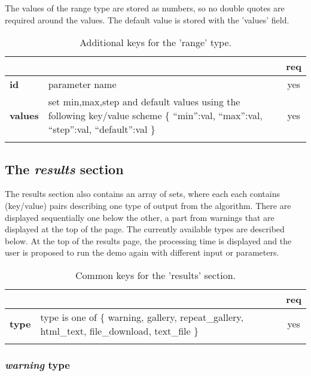 The values of the range type are stored as numbers, so no double quotes are 
required around the values. The default value is stored with the 'values' field.

\begin{longtable}{|>{\bf}L{\linewidth}|L{\linewidth}|c|}
\hline
      &  & {\bf req} 
\tabularnewline \hline \hline
 id     & parameter name  & yes \\ \hline
 values & set min,max,step and default values using the following key/value 
scheme \{ ``min'':val, ``max'':val, ``step'':val, ``default'':val \} & yes
                      \\ \hline
\caption{Additional keys for the 'range' type.}
\end{longtable}

\subsection{The \emph{results} section}


The results section also contains an array of sets, where each each contains 
(key/value) pairs describing one type of output from the algorithm. There are 
displayed sequentially one below the other, a part from warnings that are 
displayed at the top of the page. The currently available types are described 
below. At the top of the results page, the processing time is displayed and the 
user is proposed to run the demo again with different input or parameters.

\begin{longtable}{|>{\bf}L{\linewidth}|L{\linewidth}|c|}
\hline
      &  & {\bf req} 
\tabularnewline \hline \hline
 type      & type is one of \{  warning, gallery, repeat\_gallery, html\_text, 
                                file\_download, text\_file \}  & yes \\ \hline
\caption{Common keys for the 'results' section.}
\end{longtable}


\subsubsection{ \emph{warning} type}


